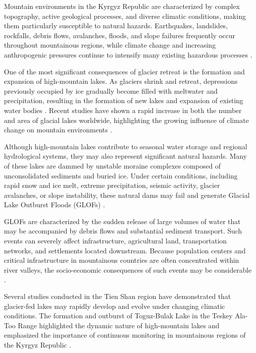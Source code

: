 \documentclass[12pt,a4paper]{report}
\begin{document}
Mountain environments in the Kyrgyz Republic are characterized by complex topography, active geological processes, and diverse climatic conditions, making them particularly susceptible to natural hazards. Earthquakes, landslides, rockfalls, debris flows, avalanches, floods, and slope failures frequently occur throughout mountainous regions, while climate change and increasing anthropogenic pressures continue to intensify many existing hazardous processes \cite{MESKR2024}. 

One of the most significant consequences of glacier retreat is the formation and expansion of high-mountain lakes. As glaciers shrink and retreat, depressions previously occupied by ice gradually become filled with meltwater and precipitation, resulting in the formation of new lakes and expansion of existing water bodies \cite{shugar2020}. Recent studies have shown a rapid increase in both the number and area of glacial lakes worldwide, highlighting the growing influence of climate change on mountain environments \cite{Zhang2023}. 

Although high-mountain lakes contribute to seasonal water storage and regional hydrological systems, they may also represent significant natural hazards. Many of these lakes are dammed by unstable moraine complexes composed of unconsolidated sediments and buried ice. Under certain conditions, including rapid snow and ice melt, extreme precipitation, seismic activity, glacier avalanches, or slope instability, these natural dams may fail and generate Glacial Lake Outburst Floods (GLOFs) \cite{Richardson2000, Emmer2013}. 

GLOFs are characterized by the sudden release of large volumes of water that may be accompanied by debris flows and substantial sediment transport. Such events can severely affect infrastructure, agricultural land, transportation networks, and settlements located downstream. Because population centers and critical infrastructure in mountainous countries are often concentrated within river valleys, the socio-economic consequences of such events may be considerable \cite{Richardson2000}. 

Several studies conducted in the Tien Shan region have demonstrated that glacier-fed lakes may rapidly develop and evolve under changing climatic conditions. The formation and outburst of Toguz-Bulak Lake in the Teskey Ala-Too Range highlighted the dynamic nature of high-mountain lakes and emphasized the importance of continuous monitoring in mountainous regions of the Kyrgyz Republic \cite{Daiyrov2020}. 
\end{document}
